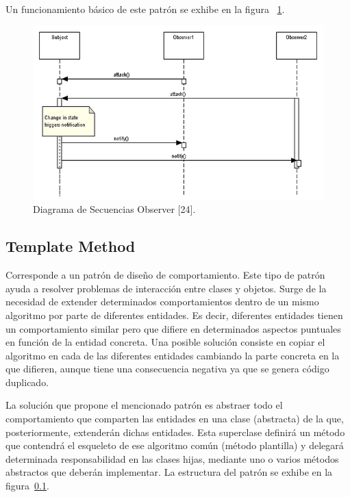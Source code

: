 Un funcionamiento básico de este patrón se exhibe en la figura ~\ref{observerDiagram}.

\begin{figure}[h!]
	\centering
		\includegraphics[scale=0.5]{image/observerDiagram.png}
	\caption{Diagrama de Secuencias Observer [24].}
	\label{observerDiagram} 
\end{figure}

\subsection{Template Method}
\label{templateMethod}

\par Corresponde a un patrón de diseño de comportamiento. Este tipo de patrón ayuda a resolver problemas de interacción entre clases y objetos. Surge de la necesidad de extender determinados comportamientos dentro de un mismo algoritmo por parte de diferentes entidades. Es decir, diferentes entidades tienen un comportamiento similar pero que difiere en determinados aspectos puntuales en función de la entidad concreta. Una posible solución consiste en copiar el algoritmo en cada de las diferentes entidades cambiando la parte concreta en la que difieren, aunque tiene una consecuencia negativa ya que se genera código duplicado.  
\par La solución que propone el mencionado patrón es abstraer todo el comportamiento que comparten las entidades en una clase (abstracta) de la que, posteriormente, extenderán dichas entidades. Esta superclase definirá un método que contendrá el esqueleto de ese algoritmo común (método plantilla) y delegará determinada responsabilidad en las clases hijas, mediante uno o varios métodos abstractos que deberán implementar. La estructura del patrón se exhibe en la figura~\ref{templateMethod}.

